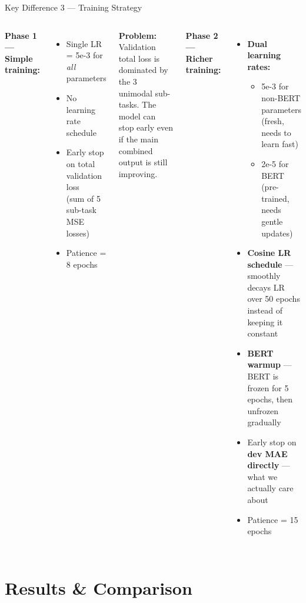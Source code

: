 \documentclass[aspectratio=169]{beamer}
\begin{document}
\begin{frame}{Key Difference 3 — Training Strategy}
  \begin{columns}[T]
      \textbf{Phase 1 — Simple training:}
      \begin{itemize}
        \item Single LR = 5e-3 for \emph{all} parameters
        \item No learning rate schedule
        \item Early stop on total validation loss\\
          (sum of 5 sub-task MSE losses)
        \item Patience = 8 epochs
      \end{itemize}

      \vspace{6pt}
      \textbf{Problem:} Validation total loss is dominated by the 3 unimodal
      sub-tasks. The model can stop early even if the main combined output
      is still improving.

      \textbf{Phase 2 — Richer training:}
      \begin{itemize}
        \item \textbf{Dual learning rates:}
          \begin{itemize}
            \item 5e-3 for non-BERT parameters (fresh, needs to learn fast)
            \item 2e-5 for BERT (pre-trained, needs gentle updates)
          \end{itemize}
        \item \textbf{Cosine LR schedule} — smoothly decays LR over 50
          epochs instead of keeping it constant
        \item \textbf{BERT warmup} — BERT is frozen for 5 epochs, then
          unfrozen gradually
        \item Early stop on \textbf{dev MAE directly} — what we actually
          care about
        \item Patience = 15 epochs
      \end{itemize}
  \end{columns}
\end{frame}

\section{Results \& Comparison}
\end{document}
